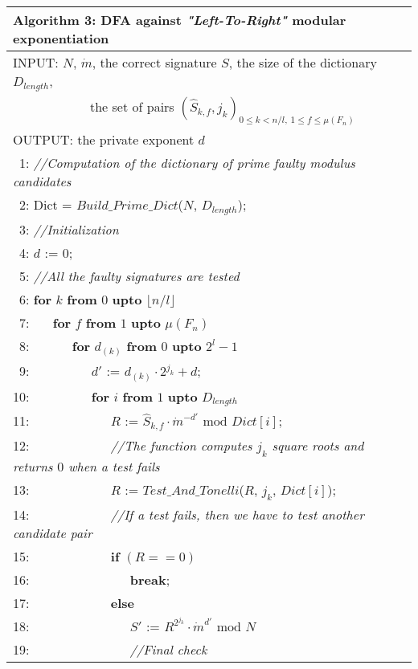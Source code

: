 \documentclass{article}
\begin{document}
\begin{table}[htbp]
\begin{center}
\begin{tabular}{l}
\hline
\hline
\textbf{Algorithm 3:} DFA against \textit{"Left-To-Right"} modular exponentiation\\
\hline
INPUT: $N$, $\dot{m}$, the correct signature $S$, the size of the dictionary $D_{length}$,\\
~~~~~~~~~~~~the set of pairs $(\hat{S}_{k,f}, j_k)_{0\leq k < n/l,~1\leq f \leq \mu\left( F_n \right)}$\\
OUTPUT: the private exponent $d$\\
\hline
~1: \textit{//Computation of the dictionary of prime faulty modulus candidates}\\
~2: Dict = $Build\_Prime\_Dict$($N$, $D_{length}$);\\
~3: \textit{//Initialization}\\
~4: $d$ := $0$;\\
~5: \textit{//All the faulty signatures are tested}\\
~6: \textbf{for} $k$ \textbf{from} $0$ \textbf{upto} $\lfloor n/l \rfloor$\\
~7: ~~~\textbf{for} $f$ \textbf{from} $1$ \textbf{upto} $\mu\left( F_n \right)$\\
~8: ~~~~~~\textbf{for} $d_{(k)}$ \textbf{from} $0$ \textbf{upto} $2^l-1$\\
~9: ~~~~~~~~~$d'$ := $d_{(k)} \cdot 2^{j_k} +d$;\\
10: ~~~~~~~~~\textbf{for} $i$ \textbf{from} $1$ \textbf{upto} $D_{length}$\\
11: ~~~~~~~~~~~~$R$ := $\hat{S}_{k,f} \cdot \dot{m}^{-d'} \mbox{ mod } Dict[i]$;\\
12: ~~~~~~~~~~~~\textit{//The function computes $j_k$ square roots and returns $0$ when a test fails}\\
13: ~~~~~~~~~~~~$R$ := $Test\_And\_Tonelli$($R$, $j_k$, $Dict[i]$);\\
14: ~~~~~~~~~~~~\textit{//If a test fails, then we have to test another candidate pair}\\
15: ~~~~~~~~~~~~\textbf{if} $\left( R == 0\right)$\\
16: ~~~~~~~~~~~~~~~\textbf{break};\\
17: ~~~~~~~~~~~~\textbf{else}\\
18: ~~~~~~~~~~~~~~~$S'$ := $R^{2^{j_k}} \cdot \dot{m}^{d'} \mbox{ mod } N$\\
19: ~~~~~~~~~~~~~~~\textit{//Final check}\\

\end{tabular}
\end{center}
\end{table}
\end{document}
